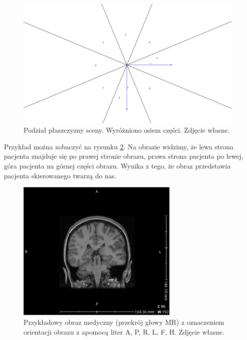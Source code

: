 \begin{figure}[!htbp]
    \centering
    \includegraphics[width=\textwidth]{img/imageorientationindicator-004.png}
    \caption{Podział płaszczyzny sceny. Wyróżniono osiem części. Zdjęcie własne.} 
    \label{fig:imageorientationindicator4}
\end{figure}

Przykład można zobaczyć na rysunku \ref{fig:imageorientationindicator1}.
Na obrazie widzimy, że lewa strona pacjenta znajduje się po prawej stronie obrazu, prawa strona pacjenta po lewej, góra pacjenta na górnej części obrazu.
Wynika z tego, że obraz przedstawia pacjenta skierowanego twarzą do nas.

\begin{figure}[!htbp]
    \centering
    \includegraphics[width=0.7\textwidth]{img/imageorientationindicator-002.png}
    \caption{Przykładowy obraz medyczny (przekrój głowy MR) z oznaczeniem orientacji obrazu z apomocą liter A, P, R, L, F, H. Zdjęcie własne.}
    \label{fig:imageorientationindicator1}
\end{figure}

